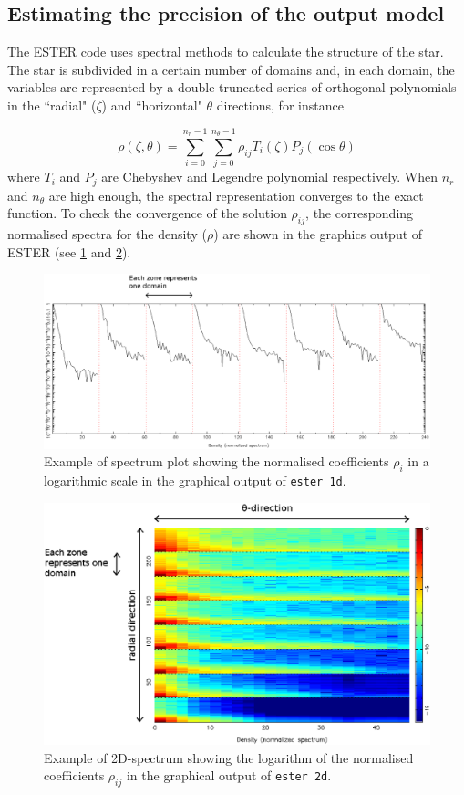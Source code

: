 \subsection{Estimating the precision of the output model}

The ESTER code uses spectral methods to calculate the structure of
the star.  The star is subdivided in a certain number of domains and, in
each domain, the variables are represented by a double truncated series
of orthogonal polynomials in the ``radial" ($\zeta$) and ``horizontal"
$\theta$ directions, for instance

\[\rho(\zeta,\theta)=
\sum_{i=0}^{n_r-1}\sum_{j=0}^{n_\theta-1}\rho_{ij}T_i(\zeta)P_j(\cos\theta)\]
where $T_i$ and $P_j$ are Chebyshev and Legendre polynomial
respectively.
When $n_r$ and $n_\theta$ are high enough, the spectral representation
converges to the exact function.  To check the convergence of
the solution $\rho_{ij}$, the corresponding normalised spectra for
the density ($\rho$) are shown in the graphics output of ESTER (see
\ref{fig:spectrum1d} and \ref{fig:spectrum2d}).

\begin{figure}[H]
\includegraphics[width=\textwidth]{fig/spectrum1d.eps}
\caption{Example of spectrum plot showing the normalised coefficients $\rho_{i}$ in a logarithmic scale
 in the graphical output of {\tt ester 1d}.
\label{fig:spectrum1d}}
\end{figure} 
\begin{figure}[H]
\includegraphics[width=\textwidth]{fig/spectrum2d.eps}
\caption{Example of 2D-spectrum showing the logarithm of the normalised coefficients $\rho_{ij}$ 
in the graphical output of {\tt ester 2d}.
\label{fig:spectrum2d}}
\end{figure}

